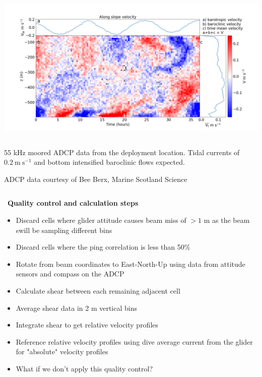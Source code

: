 \documentclass[unknownkeysallowed,usepdftitle=false]{beamer}
\newcommand{\secvariable}{nothing}
\newcommand{\mysection}[1]{\renewcommand{\secvariable}{#1}
}
\begin{document}
\begin{frame}\label{fsc_shear}
\vspace*{-10mm}    
\begin{center}
\includegraphics[trim=20 20 20 60,clip,width=\paperwidth]{figure/adcp_fsc.png}
\end{center}
\vspace*{-5mm}    
\begin{columns}
\begin{column}[t]{0.9\textwidth}
55 kHz moored ADCP data from the deployment location. Tidal currents of $0.2\ \mathrm{m\ s^{-1}}$ and bottom intensified baroclinic flows expected.

ADCP data courtesy of Bee Berx, Marine Scotland Science
\end{column}
\end{columns}
 
\end{frame}
\mysection{qc}
\begin{frame}\label{\secvariable}
\ \textbf{Quality control  and calculation steps}
\begin{itemize}
\item Discard cells where glider attitude causes beam miss of $> 1$ m as the beam swill be sampling different bins \hyperlink{flight_envelope}{}
\item Discard cells where the ping correlation is less than 50\%
 \hyperlink{ping_corr}{}
\item Rotate from beam coordinates to East-North-Up using data from attitude sensors and compass on the ADCP
\item Calculate shear between each remaining adjacent cell
\item Average shear data in 2 m vertical bins
\item Integrate shear to get relative velocity profiles
\item Reference relative velocity profiles using dive average current from the glider for "absolute" velocity profiles
\item What if we don't apply this quality control? \hyperlink{no_qc}{}
\end{itemize}
\end{frame}
\end{document}
